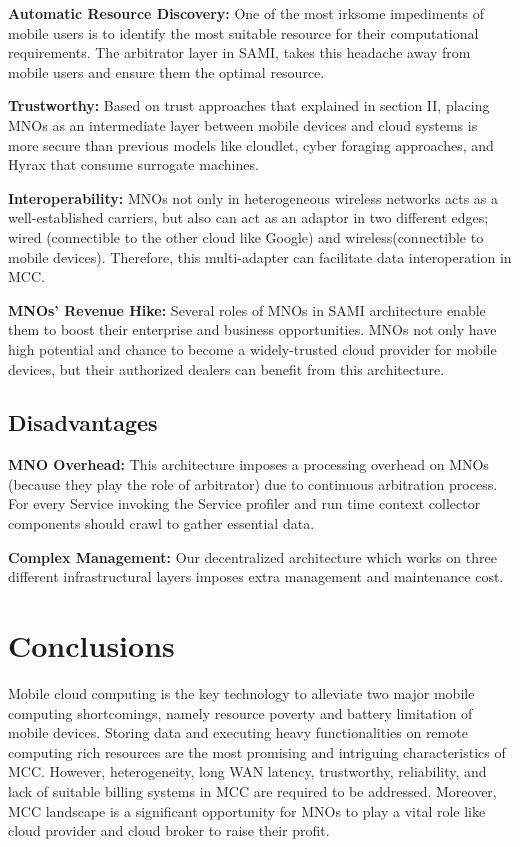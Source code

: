 \documentclass[conference]{IEEEtran}
\begin{document}
\textbf{Automatic Resource Discovery:} One of the most irksome impediments of mobile users is to identify the most suitable resource for their computational requirements. The arbitrator layer in SAMI, takes this headache away from mobile users and ensure them the optimal resource.

\textbf{Trustworthy:} Based on trust approaches that explained in section II, placing MNOs as an intermediate layer between mobile devices and cloud systems is more secure than previous models like cloudlet, cyber foraging \cite{Satyanarayanan2001} approaches, and Hyrax \cite{Marinelli2009} that consume surrogate machines.

\textbf{Interoperability:} MNOs not only in heterogeneous wireless networks acts as a well-established carriers, but also can act as an adaptor in two different edges; wired (connectible to the other cloud like Google) and wireless(connectible to mobile devices). Therefore, this multi-adapter can facilitate data interoperation in MCC.

\textbf{MNOs' Revenue Hike:} Several roles of MNOs in SAMI architecture enable them to boost their enterprise and business opportunities. MNOs not only have high potential and chance to become a widely-trusted cloud provider for mobile devices, but their authorized dealers can benefit from this architecture.

\subsection {Disadvantages}

\textbf{MNO Overhead:} This architecture imposes a processing overhead on MNOs (because they play the role of arbitrator) due to continuous arbitration process. For every Service invoking the Service profiler and run time context collector components should crawl to gather essential data.

\textbf{Complex Management:} Our decentralized architecture which works on three different infrastructural layers imposes extra management and maintenance cost.

\section{Conclusions}
Mobile cloud computing is the key technology to alleviate two major mobile computing shortcomings, namely resource poverty and battery limitation of mobile devices. Storing data and executing heavy functionalities on remote computing rich resources are the most promising and intriguing characteristics of MCC. However, heterogeneity, long WAN latency, trustworthy, reliability, and lack of suitable billing systems in MCC are required to be addressed. Moreover, MCC landscape is a significant opportunity for MNOs to play a vital role like cloud provider and cloud broker to raise their profit. 
\end{document}
